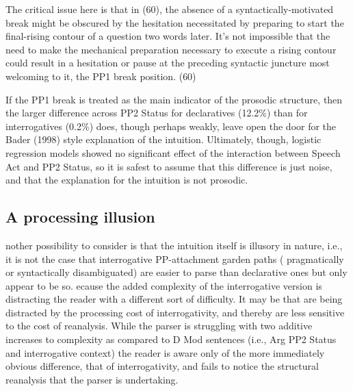 \documentclass[12pt,oneside]{book}
\begin{document}
The critical issue here is that in (60), the absence of a syntactically-motivated break might be obscured by the hesitation necessitated by preparing to start the final-rising contour of a question two words later. It's not impossible that the need to make the mechanical preparation necessary to execute a rising contour could result in a hesitation or pause at the preceding syntactic juncture most welcoming to it, the PP1 break position.  (60) 

If the PP1 break is treated as the main indicator of the prosodic structure, then the larger difference across PP2 Status for declaratives (12.2\%) than for interrogatives (0.2\%) does, though perhaps weakly, leave open the door for the Bader (1998) style explanation of the intuition. Ultimately, though, logistic regression models showed no significant effect of the interaction between Speech Act and PP2 Status, so it is safest to assume that this difference is just noise, and that the explanation for the intuition is not prosodic.

\hypertarget{a-processing-illusion}{%
\subsection{A processing illusion}\label{a-processing-illusion}}

 nother possibility to consider is that the intuition itself is illusory in nature, i.e., it is not the case that interrogative PP-attachment garden paths ( pragmatically or syntactically disambiguated) are easier to parse than declarative ones\added{,} but only appear to be so. ecause the added complexity of the interrogative version is distracting the reader with a different sort of difficulty. It may be that  are being distracted by the processing cost of interrogativity, and thereby are less sensitive to the cost of reanalysis. While the parser is struggling with two additive increases to complexity as compared to D Mod sentences (i.e., Arg PP2 Status and interrogative context) the reader is aware only of the more immediately obvious difference, that of interrogativity, and fails to  notice the structural reanalysis that the parser is undertaking.
\end{document}
